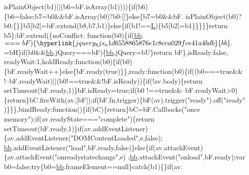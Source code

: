 \begin{DoxyCode}
      isPlainObject(b1)||(b6=bF.isArray(b1))))\{\textcolor{keywordflow}{if}(b6)\{b6=\textcolor{keyword}{false};b7=b0&&bF.isArray(b0)?b0:[]\}\textcolor{keywordflow}{else}\{b7=b0&&bF.
      isPlainObject(b0)?b0:\{\}\}b5[b2]=bF.extend(b8,b7,b1)\}\textcolor{keywordflow}{else}\{\textcolor{keywordflow}{if}(b1!==\hyperlink{jquery_8js_a38ee4c0b5f4fe2a18d0c783af540d253}{L})\{b5[b2]=b1\}\}\}\}\}\textcolor{keywordflow}{return} b5\};bF.extend(\{noConflict:\textcolor{keyword}{
      function}(b0)\{\textcolor{keywordflow}{if}(\hyperlink{jquery_8js_a1d6558865876e1c8cca029fce41a4bdb}{bb}.$===bF)\{\hyperlink{jquery_8js_a1d6558865876e1c8cca029fce41a4bdb}{bb}.$=bH\}\textcolor{keywordflow}{if}(b0&&\hyperlink{jquery_8js_a1d6558865876e1c8cca029fce41a4bdb}{bb}.jQuery===bF)\{\hyperlink{jquery_8js_a1d6558865876e1c8cca029fce41a4bdb}{bb}.jQuery=bU\}\textcolor{keywordflow}{return} bF\},isReady:\textcolor{keyword}{false},
      readyWait:1,holdReady:\textcolor{keyword}{function}(b0)\{\textcolor{keywordflow}{if}(b0)\{bF.readyWait++\}\textcolor{keywordflow}{else}\{bF.ready(\textcolor{keyword}{true})\}\},ready:\textcolor{keyword}{function}(b0)\{\textcolor{keywordflow}{if}((b0===\textcolor{keyword}{true}&&
      !--bF.readyWait)||(b0!==\textcolor{keyword}{true}&&!bF.isReady))\{\textcolor{keywordflow}{if}(!av.body)\{\textcolor{keywordflow}{return} setTimeout(bF.ready,1)\}bF.isReady=\textcolor{keyword}{true};\textcolor{keywordflow}{if}(b0
      !==\textcolor{keyword}{true}&&--bF.readyWait>0)\{\textcolor{keywordflow}{return}\}bC.fireWith(av,[bF]);\textcolor{keywordflow}{if}(bF.fn.trigger)\{bF(av).trigger(\textcolor{stringliteral}{"ready"}).off(\textcolor{stringliteral}{"ready"}
      )\}\}\},bindReady:\textcolor{keyword}{function}()\{\textcolor{keywordflow}{if}(bC)\{\textcolor{keywordflow}{return}\}bC=bF.Callbacks(\textcolor{stringliteral}{"once memory"});\textcolor{keywordflow}{if}(av.readyState===\textcolor{stringliteral}{"complete"})\{\textcolor{keywordflow}{return}
       setTimeout(bF.ready,1)\}\textcolor{keywordflow}{if}(av.addEventListener)\{av.addEventListener(\textcolor{stringliteral}{"DOMContentLoaded"},e,\textcolor{keyword}{false});
      \hyperlink{jquery_8js_a1d6558865876e1c8cca029fce41a4bdb}{bb}.addEventListener(\textcolor{stringliteral}{"load"},bF.ready,\textcolor{keyword}{false})\}\textcolor{keywordflow}{else}\{\textcolor{keywordflow}{if}(av.attachEvent)\{av.attachEvent(\textcolor{stringliteral}{"onreadystatechange"},e)
      ;\hyperlink{jquery_8js_a1d6558865876e1c8cca029fce41a4bdb}{bb}.attachEvent(\textcolor{stringliteral}{"onload"},bF.ready);var b0=\textcolor{keyword}{false};\textcolor{keywordflow}{try}\{b0=\hyperlink{jquery_8js_a1d6558865876e1c8cca029fce41a4bdb}{bb}.frameElement==null\}\textcolor{keywordflow}{catch}(b1)\{\}\textcolor{keywordflow}{if}(av.

\end{DoxyCode}
